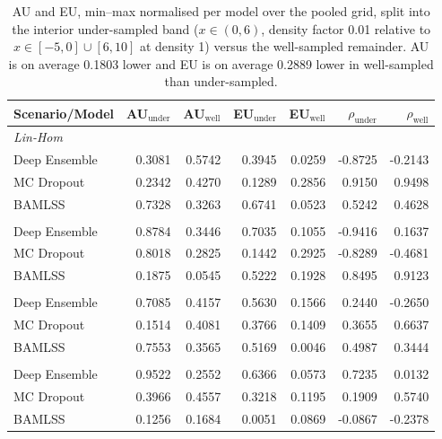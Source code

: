 \begin{table}
\centering
\small
\setlength{\tabcolsep}{4pt}
\caption{AU and EU, min--max normalised per model over the pooled grid, split into the interior under-sampled band ($x\in(0,6)$, density factor 0.01 relative to $x\in[-5,0]\cup[6,10]$ at density 1) versus the well-sampled remainder. AU is on average 0.1803 lower and EU is on average 0.2889 lower in well-sampled than under-sampled.}
\label{tab:undersampling}
\begin{tabular}{lrrrrrr}
\toprule
Scenario/Model & AU$_{\text{under}}$ & AU$_{\text{well}}$ & EU$_{\text{under}}$ & EU$_{\text{well}}$ & $\rho_{\text{under}}$ & $\rho_{\text{well}}$ \\
\midrule
\multicolumn{7}{l}{\textit{Lin-Hom}} \\
Deep Ensemble & 0.3081 & 0.5742 & 0.3945 & 0.0259 & -0.8725 & -0.2143 \\
MC Dropout & 0.2342 & 0.4270 & 0.1289 & 0.2856 & 0.9150 & 0.9498 \\
BAMLSS & 0.7328 & 0.3263 & 0.6741 & 0.0523 & 0.5242 & 0.4628 \\
\addlinespace
\multicolumn{7}{l}{\textit{Lin-Het}} \\
Deep Ensemble & 0.8784 & 0.3446 & 0.7035 & 0.1055 & -0.9416 & 0.1637 \\
MC Dropout & 0.8018 & 0.2825 & 0.1442 & 0.2925 & -0.8289 & -0.4681 \\
BAMLSS & 0.1875 & 0.0545 & 0.5222 & 0.1928 & 0.8495 & 0.9123 \\
\addlinespace
\multicolumn{7}{l}{\textit{Sin-Hom}} \\
Deep Ensemble & 0.7085 & 0.4157 & 0.5630 & 0.1566 & 0.2440 & -0.2650 \\
MC Dropout & 0.1514 & 0.4081 & 0.3766 & 0.1409 & 0.3655 & 0.6637 \\
BAMLSS & 0.7553 & 0.3565 & 0.5169 & 0.0046 & 0.4987 & 0.3444 \\
\addlinespace
\multicolumn{7}{l}{\textit{Sin-Het}} \\
Deep Ensemble & 0.9522 & 0.2552 & 0.6366 & 0.0573 & 0.7235 & 0.0132 \\
MC Dropout & 0.3966 & 0.4557 & 0.3218 & 0.1195 & 0.1909 & 0.5740 \\
BAMLSS & 0.1256 & 0.1684 & 0.0051 & 0.0869 & -0.0867 & -0.2378 \\
\bottomrule
\end{tabular}
\end{table}
